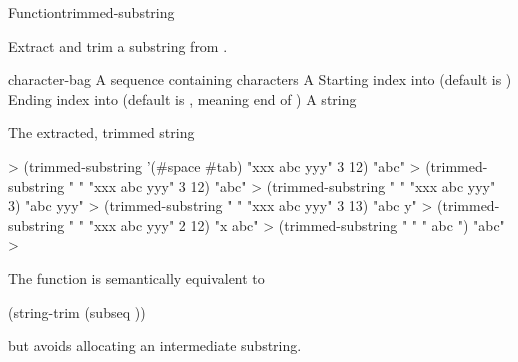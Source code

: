 \documentclass[10pt,twoside,english,pdftex]{article}
\begin{document}

\begin{functiondoc}{Function}{trimmed-substring}%
  { 
     
    \returns{} }
% 

\fnsyntax

\fnpurpose Extract and trim a substring from .

\fnpackage {}

\fnmodule {}

\fnargs
\begin{args}{character-bag}
 A sequence containing characters
\arg[string] A 
\arg[start] Starting index into  (default is )
\arg[end] Ending index into  (default is \nil, meaning
end of )
 A string
\end{args}

\fnreturns The extracted, trimmed string

\fnexamples
%
\W\supp
\begin{example}
  > (trimmed-substring '(#\bkslash{}space #\bkslash{}tab) "xxx   abc   yyy" 3 12)
  "abc"
  > (trimmed-substring " " "xxx   abc   yyy" 3 12)
  "abc"\goodpagebreak
  > (trimmed-substring " " "xxx   abc   yyy" 3)
  "abc   yyy"\goodpagebreak
  > (trimmed-substring " " "xxx   abc   yyy" 3 13)
  "abc   y"
  > (trimmed-substring " " "xxx   abc   yyy" 2 12)
  "x   abc"
  > (trimmed-substring " " "   abc   ")
  "abc"
  >
\end{example}

\fnnote The function  is semantically
equivalent to
%
\W\supp
\begin{example}
  (string-trim  (subseq ))
\end{example} 
%
but avoids allocating an intermediate substring.

\end{functiondoc}

\end{document}
